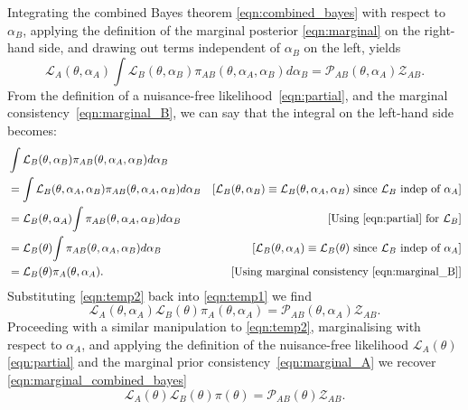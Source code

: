 Integrating the combined Bayes theorem \cref{eqn:combined_bayes} with respect to $\alpha_B$, applying the definition of the marginal posterior \cref{eqn:marginal} on the right-hand side, and drawing out terms independent of $\alpha_B$ on the left,  yields
\begin{equation}
    \mathcal{L}_A(\theta,\alpha_A)\int\mathcal{L}_B(\theta,\alpha_B)\pi_{AB}(\theta,\alpha_A,\alpha_B)d\alpha_B =  \mathcal{P}_{AB}(\theta,\alpha_A)\mathcal{Z}_{AB}.
    \label{eqn:temp1}
\end{equation}
From the definition of a nuisance-free likelihood~\cref{eqn:partial}, and the marginal consistency~\cref{eqn:marginal_B}, we can say that the integral on the left-hand side becomes:
\begin{align}
    &\int \mathcal{L}_B(\theta,\alpha_B) \pi_{AB}(\theta,\alpha_A,\alpha_B)d\alpha_B \nonumber\\
    &= \int \mathcal{L}_B(\theta,\alpha_A,\alpha_B) \pi_{AB}(\theta,\alpha_A,\alpha_B)d\alpha_B 
    &\left[\text{$\mathcal{L}_B(\theta,\alpha_B)\equiv \mathcal{L}_B(\theta,\alpha_A,\alpha_B)$ since $\mathcal{L}_B$ indep of $\alpha_A$}\right]
    \nonumber\\
    &= \mathcal{L}_B(\theta,\alpha_A) {\int \pi_{AB}(\theta,\alpha_A,\alpha_B) d\alpha_B} 
    &\left[\text{Using \cref{eqn:partial} for $\mathcal{L}_B$}\right]
    \nonumber\\
    &= \mathcal{L}_B(\theta) {\int \pi_{AB}(\theta,\alpha_A,\alpha_B) d\alpha_B} 
    &\left[\text{$\mathcal{L}_B(\theta,\alpha_A)\equiv \mathcal{L}_B(\theta)$ since $\mathcal{L}_B$ indep of $\alpha_A$}\right]
    \nonumber\\
    &= \mathcal{L}_B(\theta) \pi_A(\theta,\alpha_A).
    &\left[\text{Using marginal consistency \cref{eqn:marginal_B}}\right]
    \label{eqn:temp2}
\end{align}
Substituting \cref{eqn:temp2} back into \cref{eqn:temp1} we find
\begin{equation}
    \mathcal{L}_A(\theta,\alpha_A)\mathcal{L}_B(\theta)\pi_A(\theta,\alpha_A) =  \mathcal{P}_{AB}(\theta,\alpha_A)\mathcal{Z}_{AB}.
\end{equation}
Proceeding with a similar manipulation to \cref{eqn:temp2}, marginalising with respect to $\alpha_A$, and applying the definition of the nuisance-free likelihood $\mathcal{L}_A(\theta)$ \cref{eqn:partial} and the marginal prior consistency~\cref{eqn:marginal_A} we recover \cref{eqn:marginal_combined_bayes}
\begin{equation}
    \mathcal{L}_A(\theta)\mathcal{L}_B(\theta)\pi(\theta) =  \mathcal{P}_{AB}(\theta)\mathcal{Z}_{AB}. \nonumber
\end{equation}

